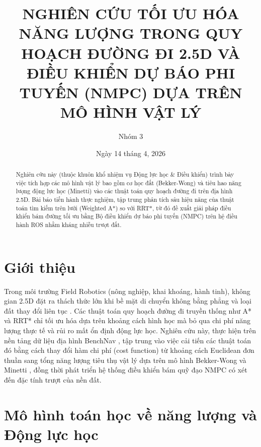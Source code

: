 \documentclass[12pt, a4paper]{article}
\title{\textbf{NGHIÊN CỨU TỐI ƯU HÓA NĂNG LƯỢNG TRONG QUY HOẠCH ĐƯỜNG ĐI 2.5D VÀ ĐIỀU KHIỂN DỰ BÁO PHI TUYẾN (NMPC) DỰA TRÊN MÔ HÌNH VẬT LÝ}}
\author{Nhóm 3}
\date{Ngày 14 tháng 4, 2026}
\begin{document}
\maketitle

\begin{abstract}
Nghiên cứu này (thuộc khuôn khổ nhiệm vụ Động lực học \& Điều khiển) trình bày việc tích hợp các mô hình vật lý bao gồm cơ học đất (Bekker-Wong) và tiêu hao năng lượng động lực học (Minetti) vào các thuật toán quy hoạch đường đi trên địa hình 2.5D. Bài báo tiến hành thực nghiệm, tập trung phân tích sâu hiệu năng của thuật toán tìm kiếm trên lưới (Weighted A*) so với RRT*, từ đó đề xuất giải pháp điều khiển bám đường tối ưu bằng Bộ điều khiển dự báo phi tuyến (NMPC) trên hệ điều hành ROS nhằm kháng nhiễu trượt đất.
\end{abstract}

\section{Giới thiệu}
Trong môi trường Field Robotics (nông nghiệp, khai khoáng, hành tinh), không gian 2.5D đặt ra thách thức lớn khi bề mặt di chuyển không bằng phẳng và loại đất thay đổi liên tục \cite{liu2023}. Các thuật toán quy hoạch đường đi truyền thống như A* \cite{hart1968} và RRT* \cite{karaman2011} chỉ tối ưu hóa dựa trên khoảng cách hình học mà bỏ qua chi phí năng lượng thực tế và rủi ro mất ổn định động lực học. Nghiên cứu này, thực hiện trên nền tảng dữ liệu địa hình BenchNav \cite{endo2024}, tập trung vào việc cải tiến các thuật toán đó bằng cách thay đổi hàm chi phí (cost function) từ khoảng cách Euclidean đơn thuần sang tổng năng lượng tiêu thụ vật lý dựa trên mô hình Bekker-Wong \cite{bekker1956} và Minetti \cite{minetti2002}, đồng thời phát triển hệ thống điều khiển bám quỹ đạo NMPC \cite{grandia2023} có xét đến đặc tính trượt của nền đất.

\section{Mô hình toán học về năng lượng và Động lực học}
\end{document}
